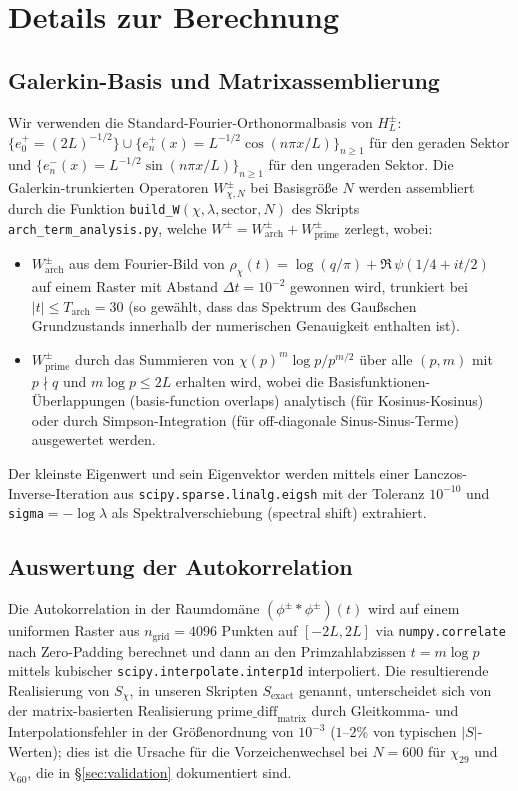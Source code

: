 \documentclass[10pt,twocolumn]{article}
\theoremstyle{definition}
\theoremstyle{remark}
\newcommand{\chifn}{\chi}
\begin{document}
\appendix

\section{Details zur Berechnung}
\label{app:computation}

\subsection{Galerkin-Basis und Matrixassemblierung}
Wir verwenden die Standard-Fourier-Orthonormalbasis von $H_L^\pm$:
$\{e_0^+=(2L)^{-1/2}\}\cup\{e_n^+(x)=L^{-1/2}\cos(n\pi x/L)\}_{n\geq 1}$
für den geraden Sektor und
$\{e_n^-(x)=L^{-1/2}\sin(n\pi x/L)\}_{n\geq 1}$ für den ungeraden Sektor.
Die Galerkin-trunkierten Operatoren $W^{\pm}_{\chifn,N}$ bei Basisgröße
$N$ werden assembliert durch die Funktion
\texttt{build\_W}$(\chifn,\lambda,\mathrm{sector},N)$ des Skripts
\texttt{arch\_term\_analysis.py}, welche
$W^\pm = W^\pm_{\mathrm{arch}} + W^\pm_{\mathrm{prime}}$ zerlegt, wobei:
\begin{itemize}
\item[(i)] $W^\pm_{\mathrm{arch}}$ aus dem Fourier-Bild
  von $\rho_{\chifn}(t)=\log(q/\pi)+\Re\,\psi(1/4+it/2)$ auf einem Raster
  mit Abstand $\Delta t=10^{-2}$ gewonnen wird, trunkiert bei $|t|\leq T_{\mathrm{arch}}=
  30$ (so gewählt, dass das Spektrum des Gaußschen Grundzustands innerhalb
  der numerischen Genauigkeit enthalten ist).
\item[(ii)] $W^\pm_{\mathrm{prime}}$ durch das Summieren
  von $\chifn(p)^m\log p/p^{m/2}$ über alle $(p,m)$ mit $p\nmid q$ und
  $m\log p\leq 2L$ erhalten wird, wobei die Basisfunktionen-Überlappungen
  (basis-function overlaps) analytisch (für Kosinus-Kosinus) oder durch
  Simpson-Integration (für off-diagonale Sinus-Sinus-Terme) ausgewertet werden.
\end{itemize}
Der kleinste Eigenwert und sein Eigenvektor werden mittels einer
Lanczos-Inverse-Iteration aus \texttt{scipy.sparse.linalg.eigsh}
mit der Toleranz $10^{-10}$ und \texttt{sigma}$=-\log\lambda$ als
Spektralverschiebung (spectral shift) extrahiert.

\subsection{Auswertung der Autokorrelation}
Die Autokorrelation in der Raumdomäne
$(\phi^\pm\ast\phi^\pm)(t)$ wird auf einem uniformen Raster aus $n_{
\mathrm{grid}}=4096$ Punkten auf $[-2L,2L]$ via \texttt{numpy.correlate}
nach Zero-Padding berechnet und dann an den Primzahlabzissen
$t=m\log p$ mittels kubischer \texttt{scipy.interpolate.interp1d} interpoliert.
Die resultierende Realisierung von $S_{\chifn}$, in unseren Skripten
$S_{\mathrm{exact}}$ genannt, unterscheidet sich von der matrix-basierten Realisierung
$\mathrm{prime\_diff}_{\mathrm{matrix}}$ durch Gleitkomma- und
Interpolationsfehler in der Größenordnung von $10^{-3}$ ($1$--$2\%$ von typischen
$|S|$-Werten); dies ist die Ursache für die Vorzeichenwechsel bei $N=600$
für $\chifn_{29}$ und $\chifn_{60}$, die in
\S\ref{sec:validation} dokumentiert sind.
\end{document}
